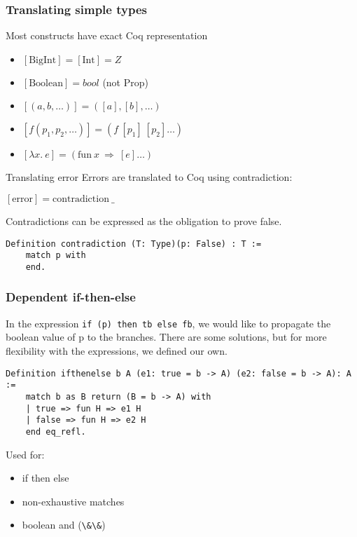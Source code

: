 \documentclass{beamer}
\newcommand{\tr}[1]{[#1]}
\newcommand{\scalaInline}[1]{\lstinline[style=myScalastyle]|#1|}
\begin{document}
\begin{frame}
	\frametitle{Translating simple types}
	
	Most constructs have exact Coq representation
	
	\begin{itemize}
		\item $\tr{\text{BigInt}} = \tr{\text{Int}} = Z$
		
		\item $\tr{\text{Boolean}} =  bool$ (not Prop)
		
		\item $\tr{(a,b,\ldots)} = (\tr{a},\tr{b},\ldots)$
		
		\item $\tr{f(p_1,p_2,\ldots)} = (f ~ \tr{p_1} ~  \tr{p_2} \ldots)$
		
		\item $\tr{\lambda x. ~ e} = (\text{fun} ~ x ~ \Longrightarrow ~ \tr{e} \ldots)$
	\end{itemize}
	 
\end{frame}

\begin{frame}[fragile]{Translating error}
	Errors are translated to Coq using contradiction:
	
$\tr{\text{error}} = \text{contradiction} ~ \_$

Contradictions can be expressed as the obligation to prove false.
	
\begin{lstlisting}[style=myCoqstyle]
Definition contradiction (T: Type)(p: False) : T :=
	match p with 
	end.
\end{lstlisting}
\end{frame}

\begin{frame}[fragile]
	\frametitle{Dependent if-then-else}
	
	In the expression \scalaInline{if (p) then tb else fb}, we would like to propagate the boolean value of p to the branches.
	There are some solutions, but for more flexibility with the expressions, we defined our own.
	
	\begin{lstlisting}[style=myCoqstyle]
	Definition ifthenelse b A (e1: true = b -> A) (e2: false = b -> A): A :=
	match b as B return (B = b -> A) with
	| true => fun H => e1 H
	| false => fun H => e2 H
	end eq_refl.
	\end{lstlisting}
	Used for:
	\begin{itemize}
		\item if then else
		\item non-exhaustive matches
		\item boolean and (\scalaInline{\&\&})
	\end{itemize}
	
	
\end{frame}
\end{document}
